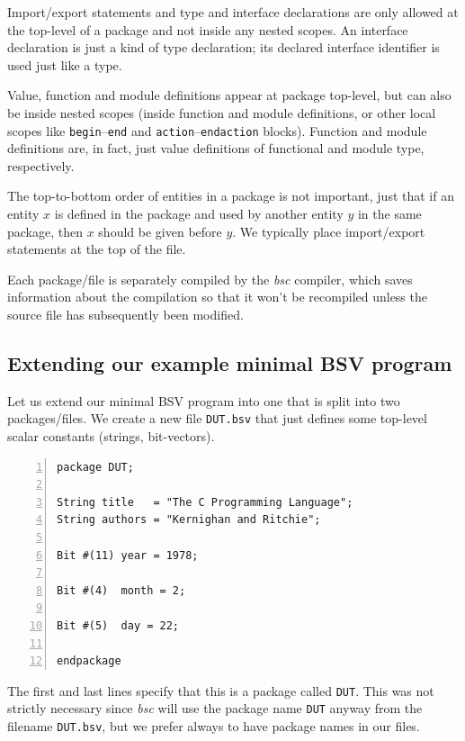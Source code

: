 Import/export statements and type and interface declarations are only
allowed at the top-level of a package and not inside any nested
scopes.  An interface declaration is just a kind of type declaration;
its declared interface identifier is used just like a type.

Value, function and module definitions appear at package top-level,
but can also be inside nested scopes (inside function and module
definitions, or other local scopes like \verb|begin|--\verb|end| and
\verb|action|--\verb|endaction| blocks).  Function and module
definitions are, in fact, just value definitions of functional and
module type, respectively.

The top-to-bottom order of entities in a package is not important,
just that if an entity $x$ is defined in the package and used by
another entity $y$ in the same package, then $x$ should be given
before $y$.  We typically place import/export statements at the top of
the file.

Each package/file is separately compiled by the \emph{bsc} compiler,
which saves information about the compilation so that it won't be
recompiled unless the source file has subsequently been modified.

\hdivider


\subsection{Extending our example minimal BSV program}

Let us extend our minimal BSV program into one that is split into two
packages/files.  We create a new file \verb|DUT.bsv| that just defines
some top-level scalar constants (strings, bit-vectors).

{\small
\begin{Verbatim}[frame=single, numbers=left, label=in file Ex\_04\_02/DUT.bsv]
package DUT;

String title   = "The C Programming Language";
String authors = "Kernighan and Ritchie";

Bit #(11) year = 1978;

Bit #(4)  month = 2;

Bit #(5)  day = 22;

endpackage
\end{Verbatim}
}

The first and last lines specify that this is a package called
\verb|DUT|.  This was not strictly necessary since \emph{bsc} will use
the package name \verb|DUT| anyway from the filename \verb|DUT.bsv|,
but we prefer always to have package names in our files.

